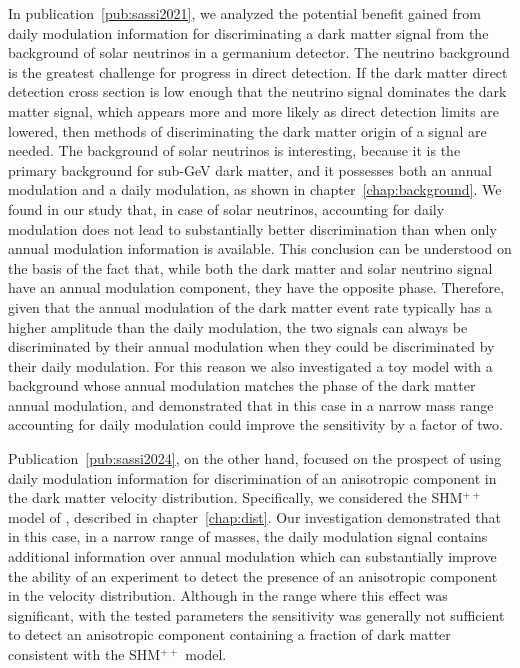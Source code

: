 In publication~\ref{pub:sassi2021}, we analyzed the potential benefit gained from daily modulation information for discriminating a dark matter signal from the background of solar neutrinos in a germanium detector. The neutrino background is the greatest challenge for progress in direct detection. If the dark matter direct detection cross section is low enough that the neutrino signal dominates the dark matter signal, which appears more and more likely as direct detection limits are lowered, then methods of discriminating the dark matter origin of a signal are needed. The background of solar neutrinos is interesting, because it is the primary background for sub-GeV dark matter, and it possesses both an annual modulation and a daily modulation, as shown in chapter~\ref{chap:background}. We found in our study that, in case of solar neutrinos, accounting for daily modulation does not lead to substantially better discrimination than when only annual modulation information is available. This conclusion can be understood on the basis of the fact that, while both the dark matter and solar neutrino signal have an annual modulation component, they have the opposite phase. Therefore, given that the annual modulation of the dark matter event rate typically has a higher amplitude than the daily modulation, the two signals can always be discriminated by their annual modulation when they could be discriminated by their daily modulation. For this reason we also investigated a toy model with a background whose annual modulation matches the phase of the dark matter annual modulation, and demonstrated that in this case in a narrow mass range accounting for daily modulation could improve the sensitivity by a factor of two.

Publication~\ref{pub:sassi2024}, on the other hand, focused on the prospect of using daily modulation information for discrimination of an anisotropic component in the dark matter velocity distribution. Specifically, we considered the SHM$^{++}$ model of \textcite{EvansOHareMcCabe2019}, described in chapter~\ref{chap:dist}. Our investigation demonstrated that in this case, in a narrow range of masses, the daily modulation signal contains additional information over annual modulation which can substantially improve the ability of an experiment to detect the presence of an anisotropic component in the velocity distribution. Although in the range where this effect was significant, with the tested parameters the sensitivity was generally not sufficient to detect an anisotropic component containing a fraction of dark matter consistent with the SHM$^{++}$ model.

